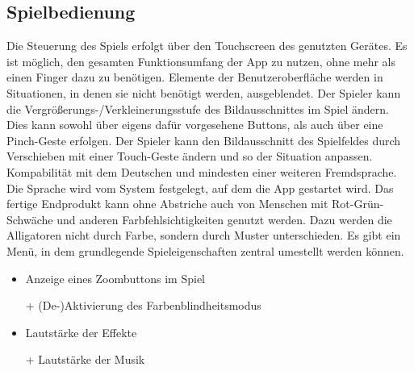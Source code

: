 \subsection {Spielbedienung}
\begin {requirements}
	 Die Steuerung des Spiels erfolgt über den Touchscreen des genutzten Gerätes.
	 Es ist möglich, den gesamten Funktionsumfang der App zu nutzen, ohne mehr als einen Finger dazu zu benötigen.
	 Elemente der Benutzeroberfläche werden in Situationen, in denen sie nicht benötigt werden, ausgeblendet.
	 Der Spieler kann die Vergrößerungs-/Verkleinerungsstufe des Bildausschnittes im Spiel ändern.
	Dies kann sowohl über eigens dafür vorgesehene Buttons, als auch über eine Pinch-Geste erfolgen.
	Der Spieler kann den Bildausschnitt des Spielfeldes durch Verschieben mit einer Touch-Geste ändern und so der Situation anpassen.
	Kompabilität mit dem Deutschen und mindesten einer weiteren Fremdsprache.
	Die Sprache wird vom System festgelegt, auf dem die App gestartet wird.
	Das fertige Endprodukt kann ohne Abstriche auch von Menschen mit Rot-Grün-Schwäche und anderen Farbfehlsichtigkeiten genutzt werden.
	Dazu werden die Alligatoren nicht durch Farbe, sondern durch Muster unterschieden.
	\req[Einstellungen] Es gibt ein Menü, in dem grundlegende Spieleigenschaften zentral umestellt werden können.
		\begin{itemize}
			\item Anzeige eines Zoombuttons im Spiel
			\item[+] (De-)Aktivierung des Farbenblindheitsmodus
			\item Lautstärke der Effekte
			\item[+] Lautstärke der Musik
		\end{itemize}
\end {requirements}

